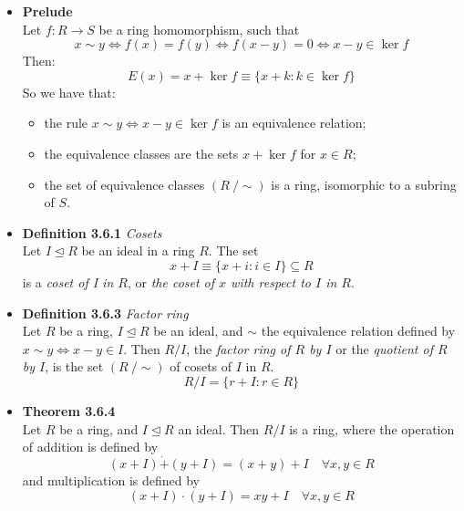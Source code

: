 \documentclass[11pt,a4paper]{article}
\begin{document}
\begin{itemize}

    \item \textbf{Prelude} \\
        Let $f : R \to S$ be a ring homomorphism, such that
        \[
            x \sim y \iff f(x) = f(y) \iff f(x-y) = 0 \iff x - y \in \ker f
        \]
        Then:
        \[
            E(x) = x + \ker f \equiv \{x + k : k \in \ker f \}
        \]
        So we have that:
        \begin{itemize}
            \item the rule $x \sim y \iff x - y \in \ker f$ is an equivalence relation;
            \item the equivalence classes are the sets $x + \ker f$ for $x \in R$;
            \item the set of equivalence classes $(R \ / \sim)$ is a ring,
                isomorphic to a subring of $S$.
        \end{itemize}

    \item \textbf{Definition 3.6.1} \emph{Cosets} \\
        Let $I \trianglelefteq R$ be an ideal in a ring $R$.
        The set
        \[
            x+I \equiv \{x + i : i \in I\} \subseteq R
        \]
        is a \emph{coset of I in $R$}, or
        \emph{the coset of $x$ with respect to $I$ in $R$}.

    \item \textbf{Definition 3.6.3} \emph{Factor ring} \\
        Let $R$ be a ring, $I \trianglelefteq R$ be an ideal, and $\sim$ the equivalence
        relation defined by $x \sim y \iff x-y \in I$.
        Then $R/I$, the \emph{factor ring of $R$ by $I$} or the
        \emph{quotient of $R$ by $I$}, is the set $(R \ / \sim)$ of cosets of $I$ in $R$.
        \[
            R/I = \{r + I : r \in R \}
        \]

    \item \textbf{Theorem 3.6.4} \\
        Let $R$ be a ring, and $I \trianglelefteq R$ an ideal.
        Then $R/I$ is a ring, where the operation of addition is defined by
        \[
            (x+I) \dot{+} (y+I) = (x+y) + I \quad \forall x,y \in R
        \]
        and multiplication is defined by
        \[
            (x+I) \cdot (y+I) = x y + I \quad \forall x,y \in R
        \]


\end{itemize}
\end{document}
